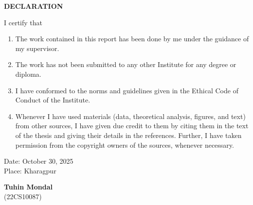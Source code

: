 \begin{center}
    {\Large\textbf{DECLARATION}}\\[0.4in]
\end{center}

I certify that

\begin{enumerate}
    \item The work contained in this report has been done by me under the guidance of my supervisor.
    \item The work has not been submitted to any other Institute for any degree or diploma.
    \item I have conformed to the norms and guidelines given in the Ethical Code of Conduct of the Institute.
    \item Whenever I have used materials (data, theoretical analysis, figures, and text) from other sources, I have given due credit to them by citing them in the text of the thesis and giving their details in the references. Further, I have taken permission from the copyright owners of the sources, whenever necessary.
\end{enumerate}
\vspace{3in}
\noindent
\begin{minipage}[t]{0.48\textwidth}
Date: October 30, 2025 \\
Place: Kharagpur
\end{minipage}\hfill
\begin{minipage}[t]{0.48\textwidth}
\begin{flushright}
\textbf{Tuhin Mondal}\\
(22CS10087)
\end{flushright}
\end{minipage}

\newpage
